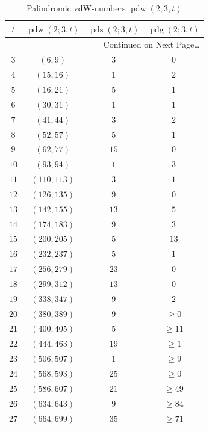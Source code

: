 \documentclass[final,3p,times]{elsarticle}
\theoremstyle{definition}
\DeclareMathOperator{\vdwpd}{pdw}
\DeclareMathOperator{\pdg}{pdg}
\DeclareMathOperator{\pds}{pds}
\begin{document}
{\renewcommand{\arraystretch}{1.4}
\begin{longtable}[c]{|c|c|c|c|}
\caption{Palindromic vdW-numbers $\vdwpd(2; 3, t)$}
\label{tab-pdprecise}\\
  \hline \hline
 $t$ & $\vdwpd(2;3,t)$ & $\pds(2;3,t)$ & $\pdg(2;3,t)$\\
  \hline
\endhead
\hline
  \multicolumn{4}{|r|}{{Continued on Next Page\ldots}} \\
\hline
\endfoot
\endlastfoot

$3$ & $(6,9)$ & $3$ & $0$ \\
\hline

$4$ & $(15,16)$ & $1$ & $2$\\
\hline
$5$ & $(16,21)$ & $5$  & $1$\\
\hline
$6$ & $(30,31)$ & $1$ & $1$\\
\hline
$7$ & $(41,44)$ & $3$ & $2$\\
\hline
$8$ & $(52,57)$ & $5$ & $1$\\
\hline
$9$ & $(62,77)$ & $15$ & $0$\\
\hline
$10$ & $(93,94)$ & $1$ & $3$\\
\hline
$11$ & $(110,113)$ & $3$ & $1$\\
\hline
$12$ & $(126,135)$ & $9$ & $0$\\
\hline
$13$ & $(142,155)$ & $13$ & $5$\\
\hline
$14$ & $(174, 183)$ & $9$ & $3$\\
\hline
$15$ & $(200, 205)$ & $5$ & $13$ \\
\hline
$16$ & $(232, 237)$ & $5$ & $1$ \\
\hline
$17$ & $(256, 279)$ & $23$ & $0$ \\
\hline
$18$ & $(299, 312)$ & $13$ & $0$ \\
\hline
$19$ & $(338, 347)$ & $9$ & $2$ \\
\hline
\hline
$20$ & $(380, 389)$ & $9$ & $\geq 0$ \\
\hline
$21$ & $(400, 405)$ & $5$ & $\geq 11$ \\
\hline
$22$ & $(444, 463)$ & $19$ & $\geq 1$ \\
\hline
$23$ & $(506, 507)$ & $1$ & $\geq 9$ \\
\hline
$24$ & $(568, 593)$ & $25$ & $\geq 0$ \\
\hline
$25$ & $(586, 607)$ & $21$ & $\geq 49$ \\
\hline
$26$ & $(634,643)$ & $9$ & $\geq 84$ \\
\hline
$27$ & $(664,699)$ & $35$ & $\geq 71$\\
\hline


\hline
\hline
\end{longtable}
}
\end{document}
